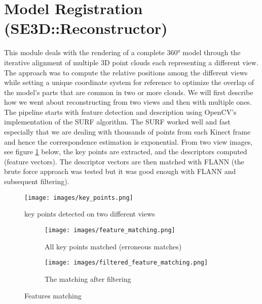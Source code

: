 \documentclass[a4paper]{report}
\begin{document}
\section{Model Registration (SE3D::Reconstructor)}
This module deals with the rendering of a complete 360° model through the iterative alignment of multiple 3D point clouds each representing a different view. The approach was to compute the relative positions among the different views while setting a unique coordinate system for reference to optimize the overlap of the model’s parts that are common in two or more clouds. We will first describe how we went about reconstructing from two views and then with multiple ones. The pipeline starts with feature detection and description using OpenCV’s implementation of the SURF algorithm. The SURF worked well and fast especially that we are dealing with thousands of points from each Kinect frame and hence the correspondence estimation is exponential. From two view images, see figure \ref{key_points} below, the key points are extracted, and the descriptors computed (feature vectors). The descriptor vectors are then matched with FLANN (the brute force approach was tested but it was good enough with FLANN and subsequent filtering).
\begin{figure}[h]
\centering
\texttt{[image: images/key\_points.png]}
\caption{key points detected on two different views}
\label{key_points}
\end{figure}

\begin{figure}[h]
\begin{subfigure}{0.5\textwidth}
\texttt{[image: images/feature\_matching.png]}
\caption{All key points matched (erroneous matches)}
\label{feature_matching}
\end{subfigure}
\begin{subfigure}{0.5\textwidth}
\texttt{[image: images/filtered\_feature\_matching.png]}
\caption{The matching after filtering}
\label{filtered_feature_matching}
\end{subfigure}
\caption{Features matching}
\label{feature_matching}
\end{figure}
\end{document}
